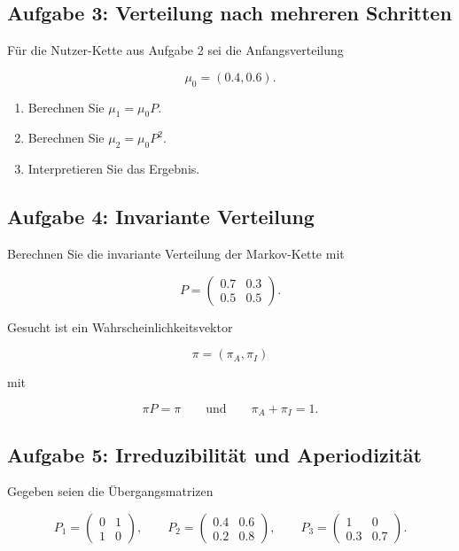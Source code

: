 \documentclass[11pt,a4paper]{article}
\begin{document}
\subsection*{Aufgabe 3: Verteilung nach mehreren Schritten}

Für die Nutzer-Kette aus Aufgabe 2 sei die Anfangsverteilung

\[
\mu_0 = (0.4,0.6).
\]

\begin{enumerate}
    \item Berechnen Sie $\mu_1 = \mu_0P$.
    \item Berechnen Sie $\mu_2 = \mu_0P^2$.
    \item Interpretieren Sie das Ergebnis.
\end{enumerate}

\subsection*{Aufgabe 4: Invariante Verteilung}

Berechnen Sie die invariante Verteilung der Markov-Kette mit

\[
P =
\begin{pmatrix}
0.7 & 0.3 \\
0.5 & 0.5
\end{pmatrix}.
\]

Gesucht ist ein Wahrscheinlichkeitsvektor

\[
\pi = (\pi_A,\pi_I)
\]

mit

\[
\pi P = \pi
\qquad \text{und} \qquad
\pi_A+\pi_I=1.
\]

\subsection*{Aufgabe 5: Irreduzibilität und Aperiodizität}

Gegeben seien die Übergangsmatrizen

\[
P_1 =
\begin{pmatrix}
0 & 1 \\
1 & 0
\end{pmatrix},
\qquad
P_2 =
\begin{pmatrix}
0.4 & 0.6 \\
0.2 & 0.8
\end{pmatrix},
\qquad
P_3 =
\begin{pmatrix}
1 & 0 \\
0.3 & 0.7
\end{pmatrix}.
\]
\end{document}
